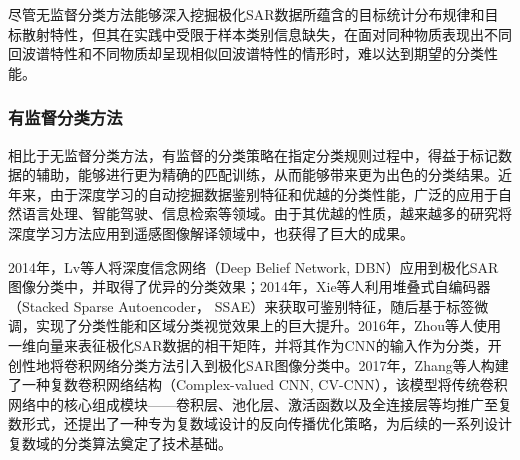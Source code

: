 
尽管无监督分类方法能够深入挖掘极化SAR数据所蕴含的目标统计分布规律和目标散射特性，但其在实践中受限于样本类别信息缺失，在面对同种物质表现出不同回波谱特性和不同物质却呈现相似回波谱特性的情形时，难以达到期望的分类性能。

\subsubsection{有监督分类方法}
相比于无监督分类方法，有监督的分类策略在指定分类规则过程中，得益于标记数据的辅助，能够进行更为精确的匹配训练，从而能够带来更为出色的分类结果。近年来，由于深度学习的自动挖掘数据鉴别特征和优越的分类性能，广泛的应用于自然语言处理、智能驾驶、信息检索等领域。由于其优越的性质，越来越多的研究将深度学习方法应用到遥感图像解译领域中，也获得了巨大的成果。



2014年，Lv等人将深度信念网络（Deep Belief Network, DBN）应用到极化SAR图像分类中，并取得了优异的分类效果；2014年，Xie等人利用堆叠式自编码器（Stacked Sparse Autoencoder， SSAE）来获取可鉴别特征，随后基于标签微调，实现了分类性能和区域分类视觉效果上的巨大提升。2016年，Zhou等人使用一维向量来表征极化SAR数据的相干矩阵，并将其作为CNN的输入作为分类，开创性地将卷积网络分类方法引入到极化SAR图像分类中。2017年，Zhang等人构建了一种复数卷积网络结构（Complex-valued CNN, CV-CNN），该模型将传统卷积网络中的核心组成模块——卷积层、池化层、激活函数以及全连接层等均推广至复数形式，还提出了一种专为复数域设计的反向传播优化策略，为后续的一系列设计复数域的分类算法奠定了技术基础。



